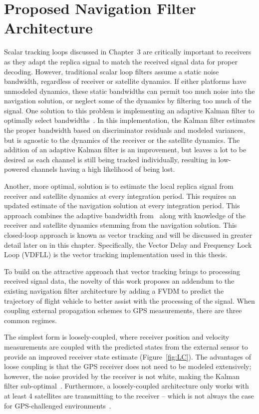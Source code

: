 \chapter{Proposed Navigation Filter Architecture}
Scalar tracking loops discussed in Chapter~3 are critically important to receivers as they adapt the replica signal to match the received signal data for proper decoding. However, traditional scalar loop filters assume a static noise bandwidth, regardless of receiver or satellite dynamics. If either platforms have unmodeled dynamics, these static bandwidths can permit too much noise into the navigation solution, or neglect some of the dynamics by filtering too much of the signal. One solution to this problem is implementing an adaptive Kalman filter to optimally select bandwidths~\cite{huangIntegratedAdaptiveKalman2019}. In this implementation, the Kalman filter estimates the proper bandwidth based on discriminator residuals and modeled variances, but is agnostic to the dynamics of the receiver or the satellite dynamics. The addition of an adaptive Kalman filter is an improvement, but leaves a lot to be desired as each channel is still being tracked individually, resulting in low-powered channels having a high likelihood of being lost.

Another, more optimal, solution is to estimate the local replica signal from receiver and satellite dynamics at every integration period. This requires an updated estimate of the navigation solution at every integration period. This approach combines the adaptive bandwidth from~\cite{huangIntegratedAdaptiveKalman2019} along with knowledge of the receiver and satellite dynamics stemming from the navigation solution. This closed-loop approach is known as {vector tracking} and will be discussed in greater detail later on in this chapter. Specifically, the Vector Delay and Frequency Lock Loop (VDFLL) is the vector tracking implementation used in this thesis.

To build on the attractive approach that vector tracking brings to processing received signal data, the novelty of this work proposes an addendum to the existing navigation filter architecture by adding a FVDM to predict the trajectory of flight vehicle to better assist with the processing of the signal. When coupling external propagation schemes to GPS measurements, there are three common regimes.

The simplest form is loosely-coupled, where receiver position and velocity measurements are coupled with the predicted states from the external sensor to provide an improved receiver state estimate (Figure~\ref{fig:LC}). The advantages of loose coupling is that the GPS receiver does not need to be modeled extensively; however, the noise provided by the receiver is not white, making the Kalman filter sub-optimal~\cite{lashleyPerformanceAnalysisVector2009}. Furthermore, a {loosely-coupled} architecture only works with at least 4 satellites are transmitting to the receiver {--} which is not always the case for GPS-challenged environments~\cite{grovesPrinciplesGNSSInertial2012}.

